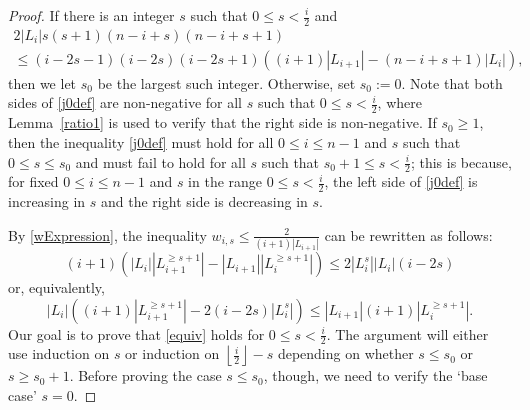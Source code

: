 \documentclass[11 pt]{article}
\theoremstyle{definition}
\theoremstyle{case}
\numberwithin{equation}{section}
\begin{document}
\begin{proof}
If there is an integer $s$ such that $0\leq s<\frac{i}{2}$ and
\begin{equation}
\begin{gathered}
\label{j0def}
2\left|L_i\right|s(s+1)(n-i+s) (n-i+s+1) \\
\leq(i-2s-1)(i-2s)(i-2s+1)\left((i+1)|L_{i+1}| - (n-i+s +1)|L_i|\right),
\end{gathered}
\end{equation}
then we let $s_0$ be the largest such integer. Otherwise, set $s_0:=0$. Note that both sides of \eqref{j0def} are non-negative for all $s$ such that $0\leq s< \frac{i}{2}$, where Lemma~\ref{ratio1} is used to verify that the right side is non-negative. If $s_0\geq1$, then the inequality \eqref{j0def} must hold for all $0\leq i\leq n-1$ and $s$ such that $0\leq s\leq s_0$ and must fail to hold for all $s$ such that $s_0+1\leq s< \frac{i}{2}$; this is because, for fixed $0\leq i\leq n-1$ and $s$ in the range $0\leq s<\frac{i}{2}$, the left side of \eqref{j0def} is increasing in $s$ and the right side is  decreasing in $s$. 

By \eqref{wExpression}, the inequality $w_{i,s}\leq \frac{2}{(i+1)\left|L_{i+1}\right|}$ can be rewritten as follows:
\[(i+1)\left(\left|L_i\right|\left|L_{i+1}^{\geq s+1}\right| - \left|L_{i+1}\right|\left|L_i^{\geq s+1}\right|\right) \leq 2\left|L_i^s\right|\left|L_i\right|(i-2s)\]
or, equivalently,
\begin{equation}\label{equiv}\left|L_i\right|\left((i+1)\left|L_{i+1}^{\geq s+1}\right| - 2(i-2s)\left|L_i^s\right|\right)\leq \left|L_{i+1}\right|(i+1)\left|L_i^{\geq s+1}\right|.\end{equation}
Our goal is to prove that \eqref{equiv} holds for $0\leq s< \frac{i}{2}$. The argument will either use induction on $s$ or  induction on $\left\lfloor\frac{i}{2}\right\rfloor - s$ depending on whether $s\leq s_0$ or $s\geq s_0+1$. Before proving the case $s\leq s_0$, though, we need to verify the `base case' $s=0$. 



\end{proof}
\end{document}
